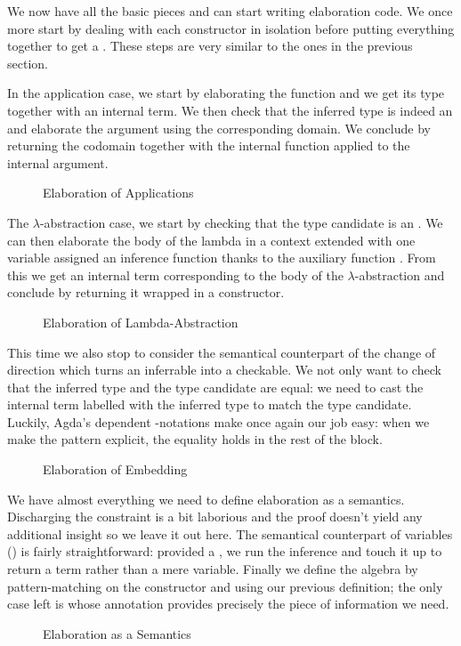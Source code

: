 We now have all the basic pieces and can start writing elaboration code. We
once more start by dealing with each constructor in isolation before putting
everything together to get a . These steps are very similar to
the ones in the previous section.

In the application case, we start by elaborating the function and we get its
type together with an internal term. We then check that the inferred type is
indeed an  and elaborate the argument using the corresponding domain.
We conclude by returning the codomain together with the internal function
applied to the internal argument.

\begin{figure}[h]
\caption{Elaboration of Applications}
\end{figure}

The $\lambda$-abstraction case, we start by checking that the type candidate
is an . We can then elaborate the body of the lambda in a context
extended with one  variable assigned an inference function thanks
to the auxiliary function . From this we get an internal term corresponding
to the body of the $\lambda$-abstraction and conclude by returning it wrapped
in a  constructor.

\begin{figure}[h]
\caption{Elaboration of Lambda-Abstraction}
\end{figure}

This time we also stop to consider the semantical counterpart of the change of
direction  which turns an inferrable into a checkable. We not only want
to check that the inferred type and the type candidate are equal: we need to cast
the internal term labelled with the inferred type to match the type candidate.
Luckily, Agda's dependent -notations make once again our job easy: when
we make the pattern  explicit, the equality holds in the rest of the block.

\begin{figure}[h]
\caption{Elaboration of Embedding}
\end{figure}

We have almost everything we need to define elaboration as a semantics. Discharging
the  constraint is a bit laborious and the proof doesn't
yield any additional insight so we leave it out here. The semantical counterpart of
variables () is fairly straightforward: provided a , we run the
inference and touch it up to return a term rather than a mere variable. Finally we
define the algebra by pattern-matching on the constructor and using our previous
definition; the only case left is  whose  annotation provides
precisely the piece of information we need.

\begin{figure}[h]
\caption{Elaboration as a Semantics}
\end{figure}
